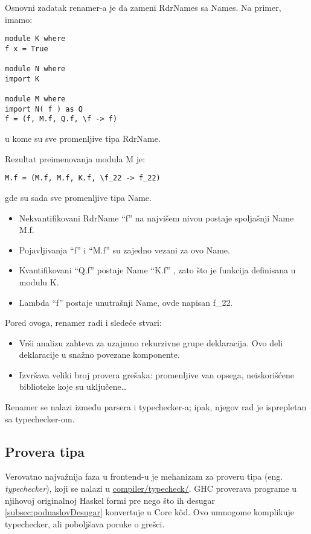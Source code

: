 Osnovni zadatak renamer-a je da zameni RdrNames sa Names. Na primer, imamo:

\begin{verbatim}
module K where
f x = True

module N where
import K

module M where
import N( f ) as Q
f = (f, M.f, Q.f, \f -> f)
\end{verbatim}
u kome su sve promenljive tipa RdrName. 

Rezultat preimenovanja modula M je:
\begin{verbatim}
M.f = (M.f, M.f, K.f, \f_22 -> f_22)
\end{verbatim} 
gde su sada sve promenljive tipa Name.
\begin{itemize}
	\item Nekvantifikovani RdrName “f” na najvišem nivou postaje spoljašnji Name M.f.
	\item Pojavljivanja “f” i  “M.f” su zajedno vezani za ovo Name.
	\item Kvantifikovani “Q.f” postaje Name “K.f” , zato što je funkcija definisana u modulu K.
	\item Lambda “f” postaje unutrašnji Name, ovde napisan f\_22.
\end{itemize}

Pored ovoga, renamer radi i sledeće stvari:
\begin{itemize}
	\item Vrši analizu zahteva za uzajmno rekurzivne grupe deklaracija. Ovo deli deklaracije u snažno povezane komponente.
	\item Izvršava veliki broj provera grešaka: promenljive van opsega, neiskorišćene biblioteke koje su uključene\ldots	
\end{itemize}

Renamer se nalazi između parsera i typechecker-a; ipak, njegov rad je isprepletan sa typechecker-om.

\subsection{Provera tipa}
\label{subsec:podnaslovTypecheck}

Verovatno najvažnija faza u frontend-u je mehanizam za proveru tipa (eng. \emph{typechecker}), koji se nalazi u \underline{compiler/typecheck/}. GHC proverava programe u njihovoj originalnoj Haskel formi pre nego što ih desugar \ref{subsec:podnaslovDesugar} konvertuje u Core k\^{o}d. Ovo umnogome komplikuje typechecker, ali poboljšava poruke o grešci.

